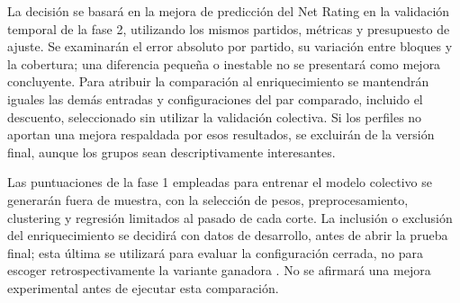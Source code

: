 La decisión se basará en la mejora de predicción del Net Rating en la validación temporal de la fase 2, utilizando los mismos partidos, métricas y presupuesto de ajuste. Se examinarán el error absoluto por partido, su variación entre bloques y la cobertura; una diferencia pequeña o inestable no se presentará como mejora concluyente. Para atribuir la comparación al enriquecimiento se mantendrán iguales las demás entradas y configuraciones del par comparado, incluido el descuento, seleccionado sin utilizar la validación colectiva. Si los perfiles no aportan una mejora respaldada por esos resultados, se excluirán de la versión final, aunque los grupos sean descriptivamente interesantes.

Las puntuaciones de la fase 1 empleadas para entrenar el modelo colectivo se generarán fuera de muestra, con la selección de pesos, preprocesamiento, clustering y regresión limitados al pasado de cada corte. La inclusión o exclusión del enriquecimiento se decidirá con datos de desarrollo, antes de abrir la prueba final; esta última se utilizará para evaluar la configuración cerrada, no para escoger retrospectivamente la variante ganadora \cite{sklearnCommonPitfallsPonderacion,cawley2010selection}. No se afirmará una mejora experimental antes de ejecutar esta comparación.
